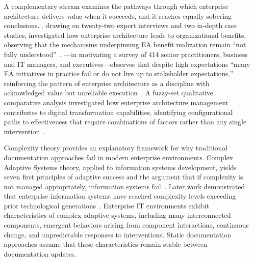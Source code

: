 A complementary stream examines the pathways through which enterprise architecture delivers value when it succeeds, and it reaches equally sobering conclusions. \citeauthor{Tamm_2022}, drawing on twenty-two expert interviews and two in-depth case studies, investigated how enterprise architecture leads to organizational benefits, observing that the mechanisms underpinning EA benefit realization remain ``not fully understood''~\parencite{Tamm_2022}. \citeauthor{van_de_Wetering_2022}---in motivating a survey of 414 senior practitioners, business and IT managers, and executives---observes that despite high expectations ``many EA initiatives in practice fail or do not live up to stakeholder expectations,'' reinforcing the pattern of enterprise architecture as a discipline with acknowledged value but unreliable execution~\parencite{van_de_Wetering_2022}.
A fuzzy-set qualitative comparative analysis investigated how enterprise architecture management contributes to digital transformation capabilities, identifying configurational paths to effectiveness that require combinations of factors rather than any single intervention~\parencite{Pattij_2022}.

Complexity theory provides an explanatory framework for why traditional documentation approaches fail in modern enterprise environments. Complex Adaptive Systems theory, applied to information systems development, yields seven first principles of adaptive success and the argument that if complexity is not managed appropriately, information systems fail~\parencite{Benbya_McKelvey_2006}. Later work demonstrated that enterprise information systems have reached complexity levels exceeding prior technological generations~\parencite{Benbya_Nan_Tanriverdi_Yoo_2020}. Enterprise IT environments exhibit characteristics of complex adaptive systems, including many interconnected components, emergent behaviors arising from component interactions, continuous change, and unpredictable responses to interventions. Static documentation approaches assume that these characteristics remain stable between documentation updates.

